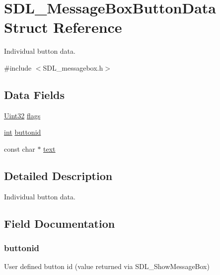 \hypertarget{struct_s_d_l___message_box_button_data}{}\section{S\+D\+L\+\_\+\+Message\+Box\+Button\+Data Struct Reference}
\label{struct_s_d_l___message_box_button_data}


Individual button data.  




{\ttfamily \#include $<$S\+D\+L\+\_\+messagebox.\+h$>$}

\subsection*{Data Fields}
\begin{DoxyCompactItemize}
\item 
\hyperlink{_s_d_l__stdinc_8h_add440eff171ea5f55cb00c4a9ab8672d}{Uint32} \hyperlink{struct_s_d_l___message_box_button_data_a048097c5cc2146ce1ff2450684f1b51c}{flags}
\item 
\hyperlink{_s_d_l__thread_8h_a6a64f9be4433e4de6e2f2f548cf3c08e}{int} \hyperlink{struct_s_d_l___message_box_button_data_a0a58b3764551f49ae76eb734277e547d}{buttonid}
\item 
const char $\ast$ \hyperlink{struct_s_d_l___message_box_button_data_a16343090e80c4472521560f30113d96c}{text}
\end{DoxyCompactItemize}


\subsection{Detailed Description}
Individual button data. 

\subsection{Field Documentation}
\subsubsection[{\texorpdfstring{buttonid}{buttonid}}]{ buttonid}\hypertarget{struct_s_d_l___message_box_button_data_a0a58b3764551f49ae76eb734277e547d}{}\label{struct_s_d_l___message_box_button_data_a0a58b3764551f49ae76eb734277e547d}
User defined button id (value returned via S\+D\+L\+\_\+\+Show\+Message\+Box) 
